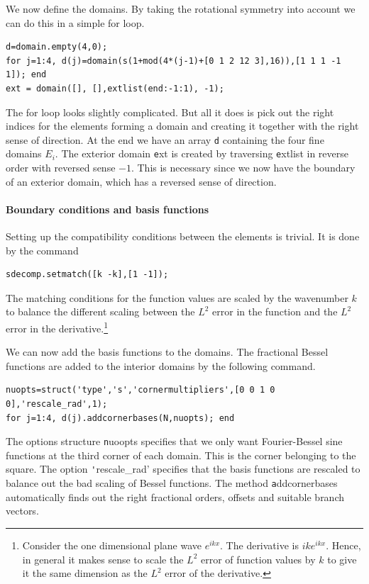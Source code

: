 We now define the domains. By taking the rotational symmetry into
account we can do this in a simple for loop.

\begin{verbatim}
d=domain.empty(4,0);
for j=1:4, d(j)=domain(s(1+mod(4*(j-1)+[0 1 2 12 3],16)),[1 1 1 -1 1]); end
ext = domain([], [],extlist(end:-1:1), -1); 
\end{verbatim}
The for loop looks slightly complicated. But all it does is pick out
the right indices for the elements forming a domain and creating it
together with the right sense of direction. At the end we have an
array {\texttt d} containing the four fine domains $E_i$. The exterior
domain {\texttt ext} is created by traversing {\texttt extlist} in
reverse order with reversed sense $-1$. This is necessary since we now
have the boundary of an exterior domain, which has a reversed sense of
direction.

\paragraph{Boundary conditions and basis functions}

Setting up the compatibility conditions between the elements is 
trivial. It is done by
the command
\begin{verbatim}
sdecomp.setmatch([k -k],[1 -1]);
\end{verbatim}
The matching conditions for the function values are scaled by the
wavenumber $k$ to balance the different scaling between the $L^2$ error
in the function and the $L^2$ error in the
derivative.\footnote{Consider the one dimensional plane wave
  $e^{ikx}$. The derivative is $ike^{ikx}$. Hence, in general it makes sense to
  scale the $L^2$ error of function values by $k$ to give it the same
  dimension as the $L^2$ error of the derivative.}

We can now add the basis functions to the domains. The fractional
Bessel functions are added to the interior domains by the following
command.
\begin{verbatim}
nuopts=struct('type','s','cornermultipliers',[0 0 1 0 0],'rescale_rad',1);
for j=1:4, d(j).addcornerbases(N,nuopts); end
\end{verbatim}
The options structure {\texttt nuoopts} specifies that we only want
Fourier-Bessel sine functions at the third corner of each domain. This
is the corner belonging to the square. The option {\texttt
  'rescale\_rad'} specifies that the basis functions are rescaled to
balance out the bad scaling of Bessel functions. The method {\texttt
  addcornerbases} automatically finds out the right fractional orders,
offsets and suitable branch vectors.

